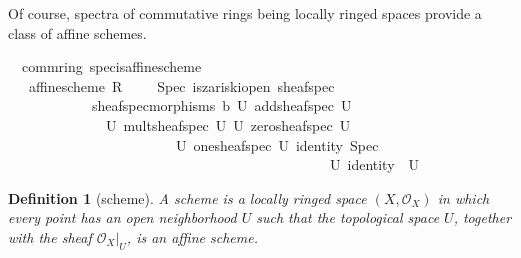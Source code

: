 \documentclass[12pt]{scrartcl}
\newtheorem{definition}[proposition]{Definition}
\begin{document}
Of course, spectra of commutative rings being locally ringed spaces provide a class of affine schemes.

\begin{isabelle}
\isamarkupfalse%
\ {\isacharparenleft}{\kern0pt}\ comm{\isacharunderscore}{\kern0pt}ring{\isacharparenright}{\kern0pt}\ spec{\isacharunderscore}{\kern0pt}is{\isacharunderscore}{\kern0pt}affine{\isacharunderscore}{\kern0pt}scheme{\isacharcolon}{\kern0pt}\isanewline
\ \ \ {\isachardoublequoteopen}affine{\isacharunderscore}{\kern0pt}scheme\ R\ {\isacharparenleft}{\kern0pt}{\isacharplus}{\kern0pt}{\isacharparenright}{\kern0pt}\ {\isacharparenleft}{\kern0pt}{\isasymcdot}{\isacharparenright}{\kern0pt}\ {\isasymzero}\ {\isasymone}\ Spec\ is{\isacharunderscore}{\kern0pt}zariski{\isacharunderscore}{\kern0pt}open\ sheaf{\isacharunderscore}{\kern0pt}spec\ \isanewline
\ \ \ \ \ \ \ \ \ \ \ \ sheaf{\isacharunderscore}{\kern0pt}spec{\isacharunderscore}{\kern0pt}morphisms\ {\isasymO}b\ {\isacharparenleft}{\kern0pt}{\isasymlambda}U{\isachardot}{\kern0pt}\ add{\isacharunderscore}{\kern0pt}sheaf{\isacharunderscore}{\kern0pt}spec\ U{\isacharparenright}{\kern0pt}\ \isanewline
\ \ \ \ \ \ \ \ \ \ \ \ \ \ {\isacharparenleft}{\kern0pt}{\isasymlambda}U{\isachardot}{\kern0pt}\ mult{\isacharunderscore}{\kern0pt}sheaf{\isacharunderscore}{\kern0pt}spec\ U{\isacharparenright}{\kern0pt}\ {\isacharparenleft}{\kern0pt}{\isasymlambda}U{\isachardot}{\kern0pt}\ zero{\isacharunderscore}{\kern0pt}sheaf{\isacharunderscore}{\kern0pt}spec\ U{\isacharparenright}{\kern0pt}\ \isanewline
\ \ \ \ \ \ \ \ \ \ \ \ \ \ \ \ \ \ \ \ \ \ \ \ {\isacharparenleft}{\kern0pt}{\isasymlambda}U{\isachardot}{\kern0pt}\ one{\isacharunderscore}{\kern0pt}sheaf{\isacharunderscore}{\kern0pt}spec\ U{\isacharparenright}{\kern0pt}\ {\isacharparenleft}{\kern0pt}identity\ Spec{\isacharparenright}{\kern0pt}\ \isanewline
\ \ \ \ \ \ \ \ \ \ \ \ \ \ \ \ \ \ \ \ \ \ \ \ \ \ \ \ \ \ \ \ \ \ \ \ \ \ \ \ \ \ \ \ \ \ {\isacharparenleft}{\kern0pt}{\isasymlambda}U{\isachardot}{\kern0pt}\ identity\ {\isacharparenleft}{\kern0pt}{\isasymO}\ U{\isacharparenright}{\kern0pt}{\isacharparenright}{\kern0pt}{\isachardoublequoteclose}
\end{isabelle}

\begin{definition}[scheme]
	A scheme is a locally ringed space $(X, \mathscr{O}_X)$ in which every point has an open neighborhood $U$ such that the topological space $U$, together with the sheaf $\mathscr{O}_X | _U$, is an affine scheme.
\end{definition}
\end{document}
